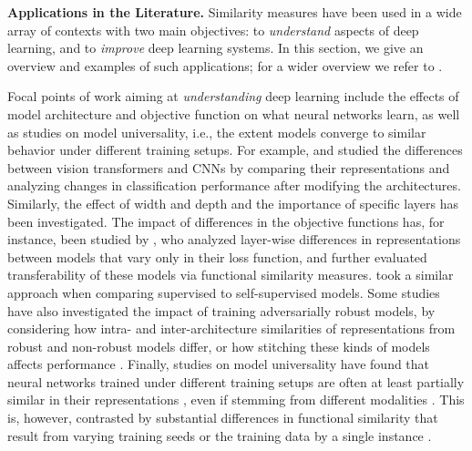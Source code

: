 \documentclass{article}
\newcommand{\citet}{\textcite}
\newcommand{\subheader}{\textbf}
\begin{document}
\subheader{Applications in the Literature.}
Similarity measures have been used in a wide array of contexts with two main objectives: to \emph{understand} aspects of deep learning, and to \emph{improve} deep learning systems.
In this section, we give an overview and examples of such applications; for a wider overview we refer to \citet[Section 4]{sucholutsky_getting_2023}.

Focal points of work aiming at \emph{understanding} deep learning include the effects of model architecture and objective function on what neural networks learn, as well as studies on model universality, i.e., the extent models converge to similar behavior under different training setups.
For example, \citet{raghu_vision_2021} and \citet{park_how_2022} studied the differences between vision transformers and CNNs by comparing their representations and analyzing changes in classification performance after modifying the architectures.
Similarly, the effect of width and depth \cite{nguyen_wide_2021} and the importance of specific layers \cite{sridhar_undivided_2020} has been investigated.
The impact of differences in the objective functions has, for instance, been studied by \citet{kornblith_why_2021}, who analyzed layer-wise differences in representations between models that vary only in their loss function, and further evaluated transferability of these models via functional similarity measures.
\citet{grigg_self-supervised_2021} took a similar approach when comparing supervised to self-supervised models.
Some studies have also investigated the impact of training adversarially robust models, by considering how intra- \cite{cianfarani_understanding_2022} and inter-architecture \cite{jones_if_2022} similarities of representations from robust and non-robust models differ, or how stitching these kinds of models affects performance \cite{balogh_functional_2023a}.
Finally, studies on model universality have found that neural networks trained under different training setups are often at least partially similar in their representations \cite{wu_similarity_2020,mcneely_exploring_2020,mehrer_individual_2020,summers_nondeterminism_2021,mehrer_beware_2018}, even if stemming from different modalities \cite{maniparambil_vision_2024}.
This is, however, contrasted by substantial differences in functional similarity that result from varying training seeds \cite{liu_model_2022,summers_nondeterminism_2021,klabunde_prediction_2023,bhojanapalli_reproducibility_2021,milani_fard_launch_2016} or the training data by a single instance \cite{black_leave-one-out_2021}.
\end{document}
